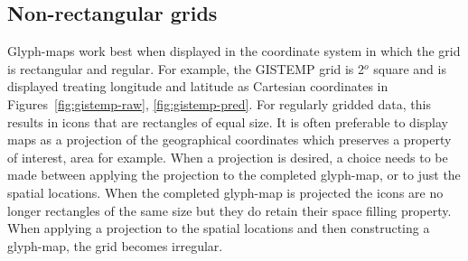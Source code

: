 \documentclass[oneside]{article}
\begin{document}
\subsection{Non-rectangular grids}

Glyph-maps work best when displayed in the coordinate system in which the grid is rectangular and regular.  For example, the GISTEMP grid is 2$^o$ square and is displayed treating longitude and latitude as Cartesian coordinates in Figures~\ref{fig:gistemp-raw}, \ref{fig:gistemp-pred}.  For regularly gridded data, this results in icons that are rectangles of equal size.  It is often preferable to display maps as a projection of the geographical coordinates which preserves a property of interest, area for example. When a projection is desired, a choice needs to be made between applying the projection to the completed glyph-map, or to just the spatial locations.  When the completed glyph-map is projected the icons are no longer rectangles of the same size but they do retain their space filling property.  When applying a projection to the spatial locations and then constructing a glyph-map, the grid becomes irregular. 
\end{document}
